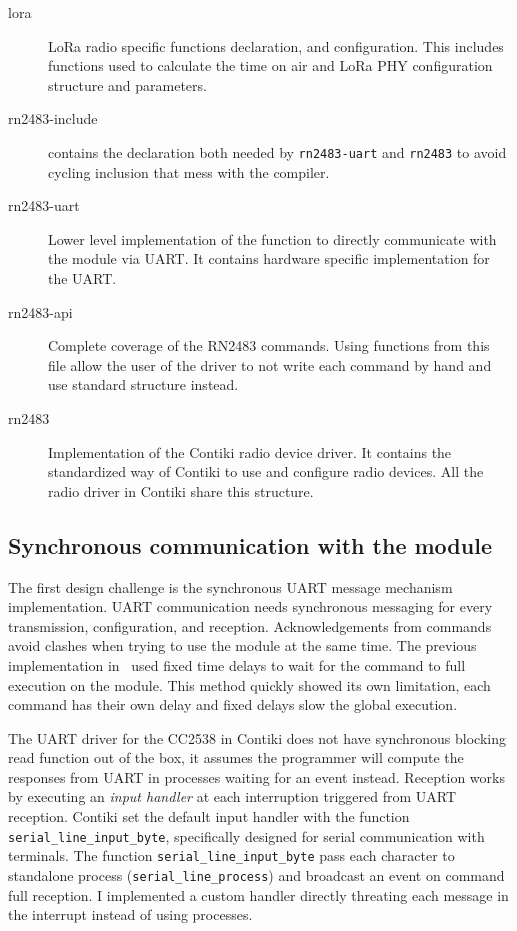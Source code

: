 \begin{description}
  \item[lora] LoRa radio specific functions declaration, and configuration. 
    This includes functions used to calculate the time on air and
    LoRa PHY configuration structure and parameters.
  \item[rn2483-include] contains the declaration both needed by
    \lstinline{rn2483-uart} and \lstinline{rn2483} to avoid cycling inclusion
    that mess with the compiler.
  \item[rn2483-uart] Lower level implementation of the function to directly
    communicate with the module via UART\@.
    It contains hardware specific implementation for the UART\@.
  \item[rn2483-api] Complete coverage of the RN2483 commands. Using functions
    from this file allow the user of the driver to not write
    each command by hand and use standard structure instead.
  \item[rn2483] Implementation of the Contiki radio device driver. 
    It contains the standardized way of Contiki to use and configure radio
    devices.
    All the radio driver in Contiki share this structure.
\end{description}

\subsection{Synchronous communication with the module}

The first design challenge is the
synchronous UART message mechanism implementation.
UART communication needs synchronous messaging for every
transmission, configuration, and reception.
Acknowledgements from commands avoid 
clashes when trying to use the module at the same time.
The previous implementation in~\cite{8847137} used fixed time delays to 
wait for the command to full execution on the module. This method 
quickly showed its own limitation, each command has their own delay and
fixed delays slow the global execution.


The UART driver for the CC2538 in Contiki does not have synchronous 
blocking read function out of the box, it assumes the programmer will compute the
responses from UART in processes waiting for an event instead.
Reception works by executing an \emph{input handler} at each interruption
triggered from UART reception.
Contiki set the default input handler with the function
\lstinline{serial_line_input_byte},
specifically designed for serial communication with terminals. 
The function \lstinline{serial_line_input_byte} pass each character to standalone
process (\lstinline{serial_line_process}) and broadcast an event on command
full reception. 
I implemented a custom handler directly threating each message in the
interrupt instead of using processes.

